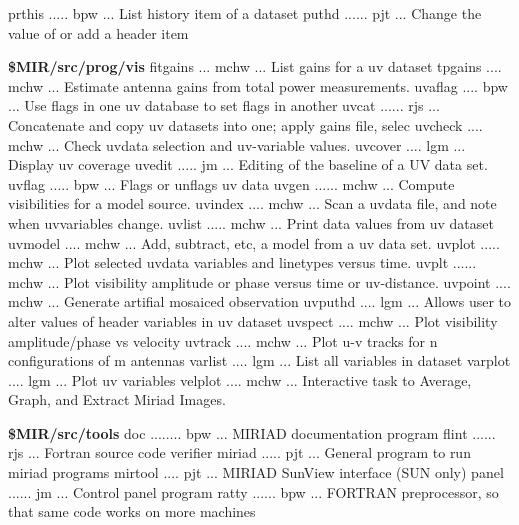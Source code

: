 {\eightpoint\begintt
prthis ..... bpw  ... List history item of a dataset 
puthd ...... pjt  ... Change the value of or add a header item 
\endtt}
\par{\bf \$MIR/src/prog/vis}
{\eightpoint\begintt
fitgains ... mchw ... List gains for a uv dataset 
tpgains .... mchw ... Estimate antenna gains from total power measurements. 
uvaflag .... bpw  ... Use flags in one uv database to set flags in another 
uvcat ...... rjs  ... Concatenate and copy uv datasets into one; apply gains file, selec
uvcheck .... mchw ... Check uvdata selection and uv-variable values. 
\endtt}
{\eightpoint\begintt
uvcover .... lgm  ... Display uv coverage 
uvedit ..... jm   ... Editing of the baseline of a UV data set. 
uvflag ..... bpw  ... Flags or unflags uv data 
uvgen ...... mchw ... Compute visibilities for a model source. 
uvindex .... mchw ... Scan a uvdata file, and note when uvvariables change. 
\endtt}
{\eightpoint\begintt
uvlist ..... mchw ... Print data values from uv dataset 
uvmodel .... mchw ... Add, subtract, etc, a model from a uv data set. 
uvplot ..... mchw ... Plot selected uvdata variables and linetypes versus time.
uvplt ...... mchw ... Plot visibility amplitude or phase versus time or uv-distance. 
uvpoint .... mchw ... Generate artifial mosaiced observation 
\endtt}
{\eightpoint\begintt
uvputhd .... lgm  ... Allows user to alter values of header variables in uv dataset
uvspect .... mchw ... Plot visibility amplitude/phase vs velocity 
uvtrack .... mchw ... Plot u-v tracks for n configurations of m antennas 
varlist .... lgm  ... List all variables in dataset 
varplot .... lgm  ... Plot uv variables 
\endtt}
{\eightpoint\begintt
velplot .... mchw ... Interactive task to Average, Graph, and Extract Miriad Images. 
\endtt}
\par{\bf \$MIR/src/tools}
{\eightpoint\begintt
doc ........ bpw  ... MIRIAD documentation program 
flint ...... rjs  ... Fortran source code verifier 
miriad ..... pjt  ... General program to run miriad programs 
mirtool .... pjt  ... MIRIAD SunView interface (SUN only) 
panel ...... jm   ... Control panel program 
\endtt}
{\eightpoint\begintt
ratty ...... bpw  ... FORTRAN preprocessor, so that same code works on more machines 
\endtt}

